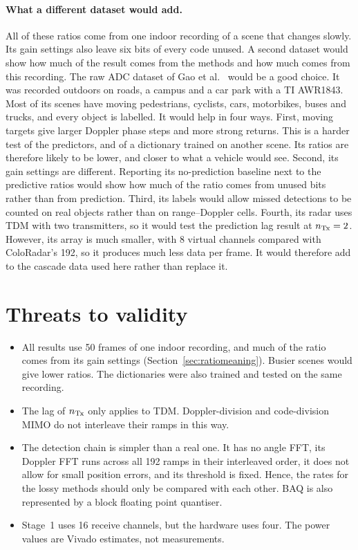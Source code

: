 \paragraph{What a different dataset would add.} All of these ratios come from
one indoor recording of a scene that changes slowly. Its gain settings also
leave six bits of every code unused. A second dataset would show how much of
the result comes from the methods and how much comes from this recording. The
raw ADC dataset of Gao et al.~\cite{gao2022} would be a good choice. It was
recorded outdoors on roads, a campus and a car park with a TI AWR1843. Most of
its scenes have moving pedestrians, cyclists, cars, motorbikes, buses and
trucks, and every object is labelled. It would help in four ways. First, moving
targets give larger Doppler phase steps and more strong returns. This is a
harder test of the predictors, and of a dictionary trained on another scene.
Its ratios are therefore likely to be lower, and closer to what a vehicle would
see. Second, its gain settings are different. Reporting its no-prediction
baseline next to the predictive ratios would show how much of the ratio comes
from unused bits rather than from prediction. Third, its labels would allow
missed detections to be counted on real objects rather than on range--Doppler
cells. Fourth, its radar uses TDM with two transmitters, so it would test the
prediction lag result at $n_{\mathrm{Tx}} = 2$. However, its array is much smaller, with 8
virtual channels compared with ColoRadar's 192, so it produces much less data
per frame. It would therefore add to the cascade data used here rather than
replace it.

\section{Threats to validity}
\label{sec:threats}

\begin{itemize}
\item All results use 50 frames of one indoor recording, and much of the ratio
comes from its gain settings (Section~\ref{sec:ratiomeaning}). Busier scenes
would give lower ratios. The dictionaries were also trained and tested on the
same recording.
\item The lag of $n_{\mathrm{Tx}}$ only applies to TDM. Doppler-division and
code-division MIMO do not interleave their ramps in this way.
\item The detection chain is simpler than a real one. It has no angle FFT, its
Doppler FFT runs across all 192 ramps in their interleaved order, it does not
allow for small position errors, and its threshold is fixed. Hence, the rates
for the lossy methods should only be compared with each other. BAQ is also
represented by a block floating point quantiser.
\item Stage~1 uses 16 receive channels, but the hardware uses four. The power
values are Vivado estimates, not measurements.
\end{itemize}
